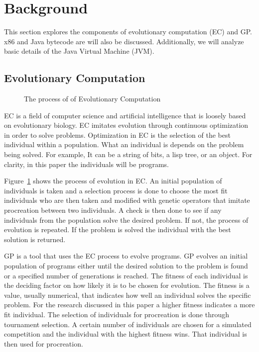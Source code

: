 \documentclass{sig-alternate}
\begin{document}
	

\section{Background}


This section explores the components of evolutionary computation (EC) and GP. x86 and Java bytecode are will also be discussed. Additionally, we will analyze basic details of the Java Virtual Machine (JVM).
\subsection{Evolutionary Computation}
\begin{figure}
\centering
{}

\caption{The process of of Evolutionary Computation}
\label{ECdiagram}
\end{figure}


EC is a field of computer science and artificial intelligence that is loosely based on evolutionary biology. EC imitates evolution through continuous optimization in order to solve problems. Optimization in EC is the selection of the best individual within a population. What an individual is depends on the problem being solved. For example, It can be a string of bits, a lisp tree, or an object. For clarity, in this paper the individuals will be programs.\par 

Figure~\ref{ECdiagram} shows the process of evolution in EC. An initial population of individuals is taken and a selection process is done to choose the most fit individuals who are then taken and modified with genetic operators that imitate procreation between two individuals. A check is then done to see if any individuals from the population solve the desired problem. If not, the process of evolution is repeated. If the problem is solved the individual with the best solution is returned.\par

	GP is a tool that uses the EC process to evolve programs. GP evolves an initial population of programs either until the desired solution to the problem is found or a specified number of generations is reached. The fitness of each individual is the deciding factor on how likely it is to be chosen for evolution. The fitness is a value, usually numerical, that indicates how well an individual solves the specific problem. For the research discussed in this paper a higher fitness indicates a more fit individual. The selection of individuals for procreation is done through tournament selection. A certain number of individuals are chosen for a simulated competition and the individual with the highest fitness wins. That individual is then used for procreation.\par 
		
\end{document}
